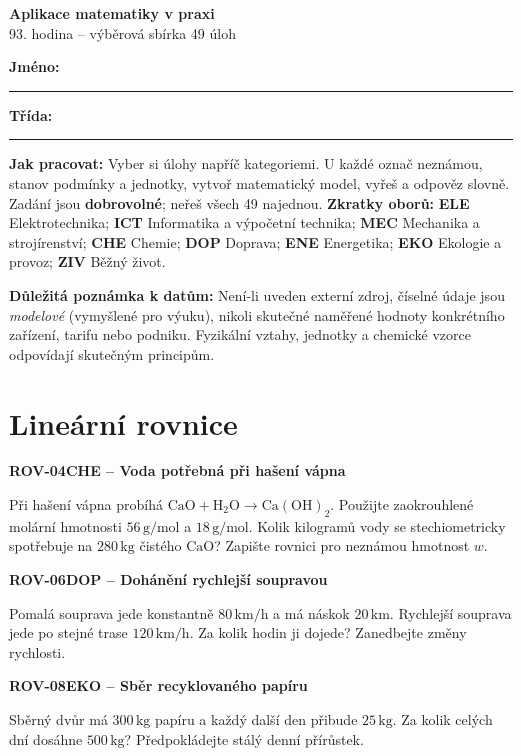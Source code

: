 \documentclass[11pt,a4paper]{article}
\begin{document}
\begin{center}{\LARGE\bfseries Aplikace matematiky v praxi}\\[2mm]{\large 93. hodina -- výběrová sbírka 49 úloh}\end{center}
\textbf{Jméno:}\rule{65mm}{.4pt}\hfill\textbf{Třída:}\rule{20mm}{.4pt}
\par\smallskip
\textbf{Jak pracovat:} Vyber si úlohy napříč kategoriemi. U každé označ neznámou, stanov podmínky a jednotky, vytvoř matematický model, vyřeš a odpověz slovně. Zadání jsou \textbf{dobrovolné}; neřeš všech 49 najednou.
\textbf{Zkratky oborů:} \textbf{ELE} Elektrotechnika; \textbf{ICT} Informatika a výpočetní technika; \textbf{MEC} Mechanika a strojírenství; \textbf{CHE} Chemie; \textbf{DOP} Doprava; \textbf{ENE} Energetika; \textbf{EKO} Ekologie a provoz; \textbf{ZIV} Běžný život.
\par\textbf{Důležitá poznámka k datům:} Není-li uveden externí zdroj, číselné údaje jsou \emph{modelové} (vymyšlené pro výuku), nikoli skutečné naměřené hodnoty konkrétního zařízení, tarifu nebo podniku. Fyzikální vztahy, jednotky a chemické vzorce odpovídají skutečným principům.
\par\medskip
\tableofcontents
\newpage

\section{Lineární rovnice}
\par\medskip\noindent\textbf{ROV-04}\quad\textbf{CHE -- Voda potřebná při hašení vápna}\par
Při hašení vápna probíhá $\mathrm{CaO+H_2O\rightarrow Ca(OH)_2}$. Použijte zaokrouhlené molární hmotnosti $56\,\mathrm{g/mol}$ a $18\,\mathrm{g/mol}$. Kolik kilogramů vody se stechiometricky spotřebuje na $280\,\mathrm{kg}$ čistého $\mathrm{CaO}$? Zapište rovnici pro neznámou hmotnost $w$.

\vspace{4mm}\par\noindent\dotfill\par\medskip
\par\medskip\noindent\textbf{ROV-06}\quad\textbf{DOP -- Dohánění rychlejší soupravou}\par
Pomalá souprava jede konstantně $80\,\mathrm{km/h}$ a má náskok $20\,\mathrm{km}$. Rychlejší souprava jede po stejné trase $120\,\mathrm{km/h}$. Za kolik hodin ji dojede? Zanedbejte změny rychlosti.

\vspace{4mm}\par\noindent\dotfill\par\medskip
\par\medskip\noindent\textbf{ROV-08}\quad\textbf{EKO -- Sběr recyklovaného papíru}\par
Sběrný dvůr má $300\,\mathrm{kg}$ papíru a každý další den přibude $25\,\mathrm{kg}$. Za kolik celých dní dosáhne $500\,\mathrm{kg}$? Předpokládejte stálý denní přírůstek.
\end{document}
